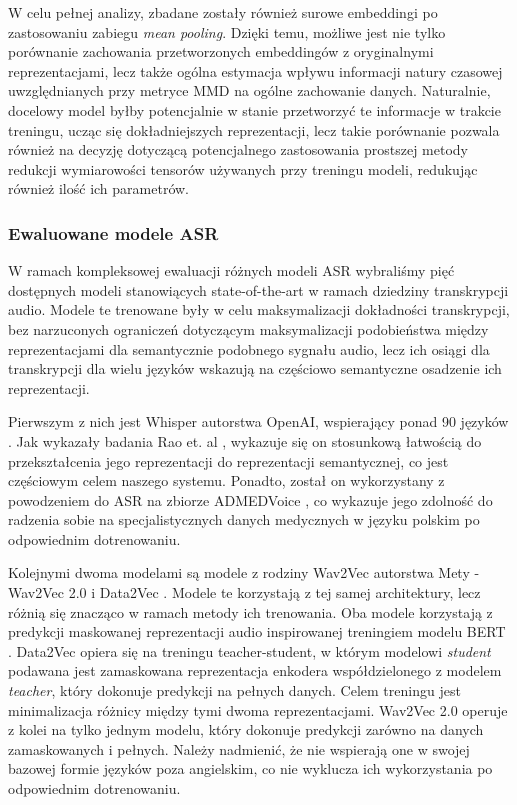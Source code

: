 W celu pełnej analizy, zbadane zostały również surowe embeddingi po zastosowaniu zabiegu \textit{mean pooling}. Dzięki temu, możliwe jest nie tylko porównanie zachowania przetworzonych embeddingów z oryginalnymi reprezentacjami, lecz także ogólna estymacja wpływu informacji natury czasowej uwzględnianych przy metryce MMD na ogólne zachowanie danych. Naturalnie, docelowy model byłby potencjalnie w stanie przetworzyć te informacje w trakcie treningu, ucząc się dokładniejszych reprezentacji, lecz takie porównanie pozwala również na decyzję dotyczącą potencjalnego zastosowania prostszej metody redukcji wymiarowości tensorów używanych przy treningu modeli, redukując również ilość ich parametrów.


\subsubsection{Ewaluowane modele ASR}
W ramach kompleksowej ewaluacji różnych modeli ASR wybraliśmy pięć dostępnych modeli stanowiących state-of-the-art w ramach dziedziny transkrypcji audio. Modele te trenowane były w celu maksymalizacji dokładności transkrypcji, bez narzuconych ograniczeń dotyczącym maksymalizacji podobieństwa między reprezentacjami dla semantycznie podobnego sygnału audio, lecz ich osiągi dla transkrypcji dla wielu języków wskazują na częściowo semantyczne osadzenie ich reprezentacji.

Pierwszym z nich jest Whisper autorstwa OpenAI, wspierający ponad 90 języków \cite{whisper}. Jak wykazały badania Rao et. al \cite{whispaSemanticAlign}, wykazuje się on stosunkową łatwością do przekształcenia jego reprezentacji do reprezentacji semantycznej, co jest częściowym celem naszego systemu. Ponadto, został on wykorzystany z powodzeniem do ASR na zbiorze ADMEDVoice \cite{ADMEDVoice}, co wykazuje jego zdolność do radzenia sobie na specjalistycznych danych medycznych w języku polskim po odpowiednim dotrenowaniu.

Kolejnymi dwoma modelami są modele z rodziny Wav2Vec autorstwa Mety - Wav2Vec 2.0 \cite{baevski2020wav2vec} i Data2Vec \cite{data2vec}. Modele te korzystają z tej samej architektury, lecz różnią się znacząco w ramach metody ich trenowania. Oba modele korzystają z predykcji maskowanej reprezentacji audio inspirowanej treningiem modelu BERT \cite{devlin2019bert}. Data2Vec opiera się na treningu teacher-student, w którym modelowi \textit{student} podawana jest zamaskowana reprezentacja enkodera współdzielonego z modelem \textit{teacher}, który dokonuje predykcji na pełnych danych. Celem treningu jest minimalizacja różnicy między tymi dwoma reprezentacjami. Wav2Vec 2.0 operuje z kolei na tylko jednym modelu, który dokonuje predykcji zarówno na danych zamaskowanych i pełnych. Należy nadmienić, że nie wspierają one w swojej bazowej formie języków poza angielskim, co nie wyklucza ich wykorzystania po odpowiednim dotrenowaniu.

